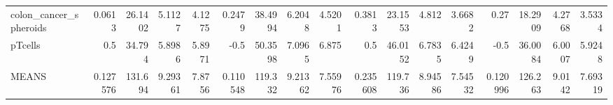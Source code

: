 \begin{tabular}{lrrrrrrrrrrrrrrrr}
 colon\_cancer\_spheroids                      &              0.0613   &          26.1402 &           5.1127  &           4.1275 &         0.2479   &     38.4994 &      6.2048  &     4.5201  &       0.3813   &   23.1553 &    4.812   &   3.6682  &         0.27     &     18.2909 &       4.2768 &     3.5334  \\
 pTcells                                     &              0.5      &          34.794  &           5.8986  &           5.8971 &        -0.5      &     50.3598 &      7.0965  &     6.875   &       0.5      &   46.0152 &    6.7835  &   6.4249  &        -0.5      &     36.0084 &       6.0007 &     5.9248  \\
 MEANS                                       &              0.127576 &         131.694  &           9.29361 &           7.8756 &         0.110548 &    119.332  &      9.21362 &     7.55976 &       0.235608 &  119.736  &    8.94586 &   7.54532 &         0.120996 &    126.263  &       9.0142 &     7.69319 \\
\hline
\end{tabular}